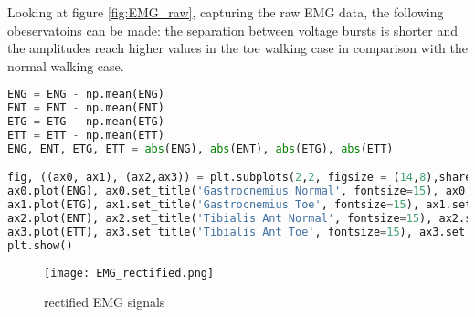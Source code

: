 \documentclass[english, a4paper, 11pt]{article}
\begin{document}
Looking at figure \ref*{fig:EMG_raw}, capturing the raw EMG data, the following obeservatoins can be made:
the separation between voltage bursts is shorter and the amplitudes reach higher values in the toe walking case
in comparison with the normal walking case.

    \begin{lstlisting}[language=Python, caption=rectified EMG calculation and plotting]
ENG = ENG - np.mean(ENG)
ENT = ENT - np.mean(ENT)
ETG = ETG - np.mean(ETG)
ETT = ETT - np.mean(ETT)
ENG, ENT, ETG, ETT = abs(ENG), abs(ENT), abs(ETG), abs(ETT)

fig, ((ax0, ax1), (ax2,ax3)) = plt.subplots(2,2, figsize = (14,8),sharey=True)
ax0.plot(ENG), ax0.set_title('Gastrocnemius Normal', fontsize=15), ax0.set_xlim(0,10000), ax0.set_ylabel('Voltage [V]', fontsize=15)
ax1.plot(ETG), ax1.set_title('Gastrocnemius Toe', fontsize=15), ax1.set_xlim(0,10000)
ax2.plot(ENT), ax2.set_title('Tibialis Ant Normal', fontsize=15), ax2.set_xlim(0,10000), ax2.set_ylabel('Voltage [V]', fontsize=15)
ax3.plot(ETT), ax3.set_title('Tibialis Ant Toe', fontsize=15), ax3.set_xlim(0,10000)
plt.show()
    \end{lstlisting}

    \begin{figure}[!h]
        \centering
        \texttt{[image: EMG\_rectified.png]}
        \caption{rectified EMG signals}
        \label{fig:EMG_rect}
    \end{figure}
\end{document}
